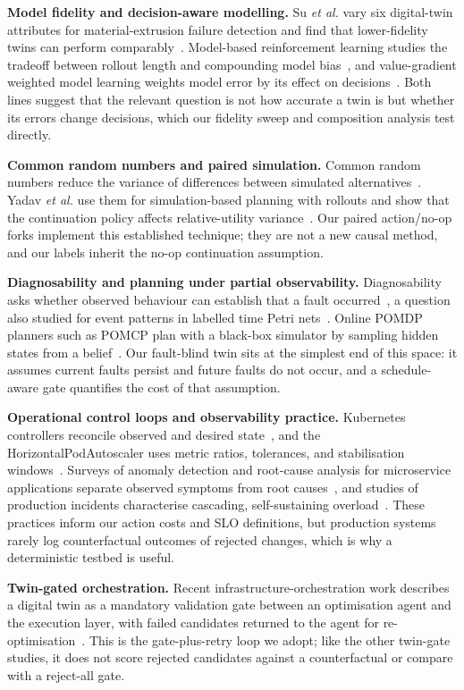 \documentclass[conference]{IEEEtran}
\begin{document}
\textbf{Model fidelity and decision-aware modelling.} Su \emph{et al.} vary six digital-twin attributes for material-extrusion failure detection and find that lower-fidelity twins can perform comparably~\cite{fidelityam}. Model-based reinforcement learning studies the tradeoff between rollout length and compounding model bias~\cite{mbrlsurvey}, and value-gradient weighted model learning weights model error by its effect on decisions~\cite{vagram}. Both lines suggest that the relevant question is not how accurate a twin is but whether its errors change decisions, which our fidelity sweep and composition analysis test directly.

\textbf{Common random numbers and paired simulation.} Common random numbers reduce the variance of differences between simulated alternatives~\cite{stochsim}. Yadav \emph{et al.} use them for simulation-based planning with rollouts and show that the continuation policy affects relative-utility variance~\cite{yadav}. Our paired action/no-op forks implement this established technique; they are not a new causal method, and our labels inherit the no-op continuation assumption.

\textbf{Diagnosability and planning under partial observability.} Diagnosability asks whether observed behaviour can establish that a fault occurred~\cite{robustdiag}, a question also studied for event patterns in labelled time Petri nets~\cite{petridiag}. Online POMDP planners such as POMCP plan with a black-box simulator by sampling hidden states from a belief~\cite{pomdpsurvey}. Our fault-blind twin sits at the simplest end of this space: it assumes current faults persist and future faults do not occur, and a schedule-aware gate quantifies the cost of that assumption.

\textbf{Operational control loops and observability practice.} Kubernetes controllers reconcile observed and desired state~\cite{k8scontroller}, and the HorizontalPodAutoscaler uses metric ratios, tolerances, and stabilisation windows~\cite{k8shpa}. Surveys of anomaly detection and root-cause analysis for microservice applications separate observed symptoms from root causes~\cite{rcasurvey}, and studies of production incidents characterise cascading, self-sustaining overload~\cite{metastable}. These practices inform our action costs and SLO definitions, but production systems rarely log counterfactual outcomes of rejected changes, which is why a deterministic testbed is useful.

\textbf{Twin-gated orchestration.} Recent infrastructure-orchestration work describes a digital twin as a mandatory validation gate between an optimisation agent and the execution layer, with failed candidates returned to the agent for re-optimisation~\cite{twingatedorch}. This is the gate-plus-retry loop we adopt; like the other twin-gate studies, it does not score rejected candidates against a counterfactual or compare with a reject-all gate.
\end{document}
